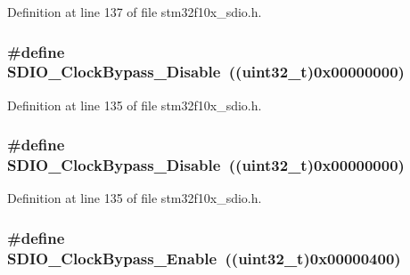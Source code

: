 Definition at line 137 of file stm32f10x\+\_\+sdio.\+h.

\subsubsection[{\texorpdfstring{S\+D\+I\+O\+\_\+\+Clock\+Bypass\+\_\+\+Disable}{SDIO_ClockBypass_Disable}}]{\setlength{\rightskip}{0pt plus 5cm}\#define S\+D\+I\+O\+\_\+\+Clock\+Bypass\+\_\+\+Disable~(({\bf uint32\+\_\+t})0x00000000)}\hypertarget{group___s_d_i_o___clock___bypass_gacc168d55136a0c6575e5afd7a6550343}{}\label{group___s_d_i_o___clock___bypass_gacc168d55136a0c6575e5afd7a6550343}


Definition at line 135 of file stm32f10x\+\_\+sdio.\+h.

\subsubsection[{\texorpdfstring{S\+D\+I\+O\+\_\+\+Clock\+Bypass\+\_\+\+Disable}{SDIO_ClockBypass_Disable}}]{\setlength{\rightskip}{0pt plus 5cm}\#define S\+D\+I\+O\+\_\+\+Clock\+Bypass\+\_\+\+Disable~(({\bf uint32\+\_\+t})0x00000000)}\hypertarget{group___s_d_i_o___clock___bypass_gacc168d55136a0c6575e5afd7a6550343}{}\label{group___s_d_i_o___clock___bypass_gacc168d55136a0c6575e5afd7a6550343}


Definition at line 135 of file stm32f10x\+\_\+sdio.\+h.

\subsubsection[{\texorpdfstring{S\+D\+I\+O\+\_\+\+Clock\+Bypass\+\_\+\+Enable}{SDIO_ClockBypass_Enable}}]{\setlength{\rightskip}{0pt plus 5cm}\#define S\+D\+I\+O\+\_\+\+Clock\+Bypass\+\_\+\+Enable~(({\bf uint32\+\_\+t})0x00000400)}\hypertarget{group___s_d_i_o___clock___bypass_ga5e1e9f7e05ea62dd2315eb556bc10e5c}{}\label{group___s_d_i_o___clock___bypass_ga5e1e9f7e05ea62dd2315eb556bc10e5c}


